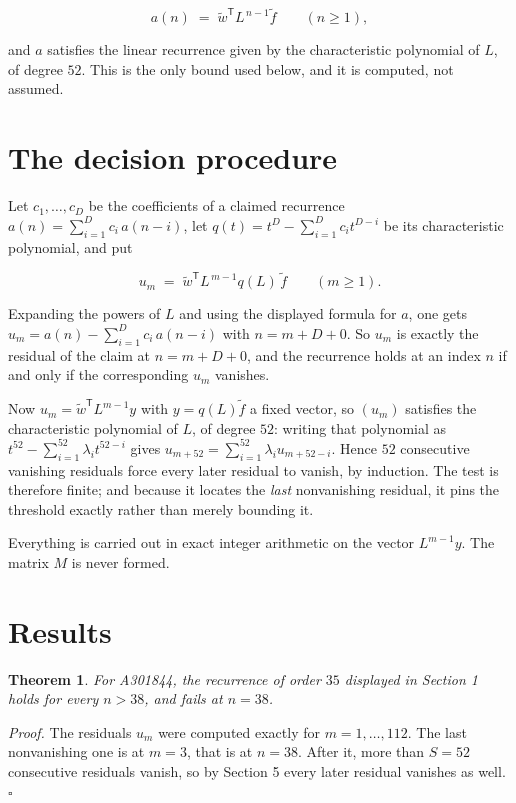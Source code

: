 \documentclass[11pt]{article}
\newtheorem{theorem}{Theorem}
\theoremstyle{definition}
\begin{document}
\[a(n) \;=\; \tilde w^{\mathsf T} L^{\,n-1} \tilde f \qquad (n \ge 1),\]

and $a$ satisfies the linear recurrence given by the characteristic polynomial of $L$, of degree $52$. This is the only bound used below, and it is computed, not assumed.

\section{The decision procedure}

Let $c_1,\dots,c_D$ be the coefficients of a claimed recurrence $a(n) = \sum_{i=1}^{D} c_i\,a(n-i)$, let $q(t) = t^{D} - \sum_{i=1}^{D} c_i t^{D-i}$ be its characteristic polynomial, and put

\[u_m \;=\; \tilde w^{\mathsf T} L^{\,m-1} q(L)\,\tilde f \qquad (m \ge 1).\]

Expanding the powers of $L$ and using the displayed formula for $a$, one gets $u_m = a(n) - \sum_{i=1}^{D} c_i\,a(n-i)$ with $n = m + D + 0$. So $u_m$ is exactly the residual of the claim at $n = m + D + 0$, and the recurrence holds at an index $n$ if and only if the corresponding $u_m$ vanishes.

Now $u_m = \tilde w^{\mathsf T} L^{m-1} y$ with $y = q(L)\tilde f$ a fixed vector, so $(u_m)$ satisfies the characteristic polynomial of $L$, of degree $52$: writing that polynomial as $t^{52} - \sum_{i=1}^{52} \lambda_i t^{52-i}$ gives $u_{m+52} = \sum_{i=1}^{52} \lambda_i u_{m+52-i}$. Hence $52$ consecutive vanishing residuals force every later residual to vanish, by induction. The test is therefore finite; and because it locates the {\itshape last} nonvanishing residual, it pins the threshold exactly rather than merely bounding it.

Everything is carried out in exact integer arithmetic on the vector $L^{m-1}y$. The matrix $M$ is never formed.

\section{Results}

\begin{theorem} For A301844, the recurrence of order $35$ displayed in Section 1 holds for every $n > 38$, and fails at $n = 38$.\end{theorem}

{\itshape Proof.} The residuals $u_m$ were computed exactly for $m = 1,\dots,112$. The last nonvanishing one is at $m = 3$, that is at $n = 38$. After it, more than $S = 52$ consecutive residuals vanish, so by Section 5 every later residual vanishes as well. $\square$
\end{document}
